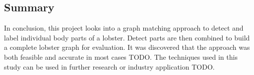 \subsection{Summary}
In conclusion, this project looks into a graph matching approach to detect and label individual body parts of a lobster. Detect parts are then combined to build a complete lobster graph for evaluation. It was discovered that the approach was both feasible and accurate in most cases TODO. The techniques used in this study can be used in further research or industry application TODO. 


